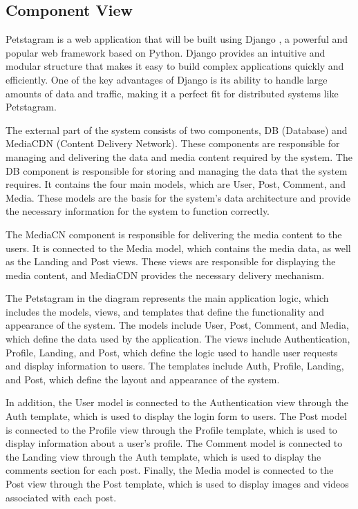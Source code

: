 \documentclass[lettersize,journal]{IEEEtran}
\begin{document}
\subsection{Component View}
\noindent
Petstagram is a web application that will be built using Django \cite{django}, a powerful and popular web framework based on Python. Django provides an intuitive and modular structure that makes it easy to build complex applications quickly and efficiently. One of the key advantages of Django is its ability to handle large amounts of data and traffic, making it a perfect fit for distributed systems like Petstagram.

The external part of the system consists of two components, DB (Database) and MediaCDN (Content Delivery Network). These components are responsible for managing and delivering the data and media content required by the system. The DB component is responsible for storing and managing the data that the system requires. It contains the four main models, which are User, Post, Comment, and Media. These models are the basis for the system's data architecture and provide the necessary information for the system to function correctly.

The MediaCN component is responsible for delivering the media content to the users. It is connected to the Media model, which contains the media data, as well as the Landing and Post views. These views are responsible for displaying the media content, and MediaCDN provides the necessary delivery mechanism.

The Petstagram in the diagram represents the main application logic, which includes the models, views, and templates that define the functionality and appearance of the system. The models include User, Post, Comment, and Media, which define the data used by the application. The views include Authentication, Profile, Landing, and Post, which define the logic used to handle user requests and display information to users. The templates include Auth, Profile, Landing, and Post, which define the layout and appearance of the system.

In addition, the User model is connected to the Authentication view through the Auth template, which is used to display the login form to users. The Post model is connected to the Profile view through the Profile template, which is used to display information about a user's profile. The Comment model is connected to the Landing view through the Auth template, which is used to display the comments section for each post. Finally, the Media model is connected to the Post view through the Post template, which is used to display images and videos associated with each post.
\end{document}
